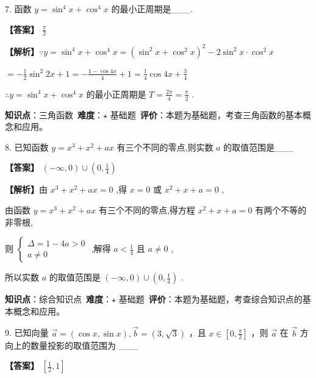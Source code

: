 \documentclass[10pt]{article}
\begin{document}
7. 函数 \(y = {\sin }^{4}x + {\cos }^{4}x\) 的最小正周期是___.

\textbf{【答案】} \(\frac{\pi }{2}\)

\textbf{【解析】}\(\because y = {\sin }^{4}x + {\cos }^{4}x = {\left( {\sin }^{2}x + {\cos }^{2}x\right) }^{2} - 2{\sin }^{2}x \cdot  {\cos }^{2}x\)

\(=  - \frac{1}{2}{\sin }^{2}{2x} + 1 =  - \frac{1 - \cos {4x}}{4} + 1 = \frac{1}{4}\cos {4x} + \frac{3}{4}\)

\(\therefore y = {\sin }^{4}x + {\cos }^{4}x\) 的最小正周期是 \(T = \frac{2\pi }{4} = \frac{\pi }{2}\) .

\begin{analysisbox}[考点分析]
\textbf{知识点}：三角函数\
\textbf{难度}：$\star$ 基础题\
\textbf{评价}：本题为基础题，考查三角函数的基本概念和应用。
\end{analysisbox}

8. 已知函数 \(y = {x}^{3} + {x}^{2} + {ax}\) 有三个不同的零点,则实数 \(a\) 的取值范围是___

\textbf{【答案】} \(\left( {-\infty ,0}\right)  \cup  \left( {0,\frac{1}{4}}\right)\)

\textbf{【解析】}由 \({x}^{3} + {x}^{2} + {ax} = 0\) ,得 \(x = 0\) 或 \({x}^{2} + x + a = 0\) ,

由函数 \(y = {x}^{3} + {x}^{2} + {ax}\) 有三个不同的零点,得方程 \({x}^{2} + x + a = 0\) 有两个不等的非零根,

则 \(\left\{  \begin{array}{l} \Delta  = 1 - {4a} > 0 \\  a \neq  0 \end{array}\right.\) ,解得 \(a < \frac{1}{4}\) 且 \(a \neq  0\) ,

所以实数 \(a\) 的取值范围是 \(\left( {-\infty ,0}\right)  \cup  \left( {0,\frac{1}{4}}\right)\) .

\begin{analysisbox}[考点分析]
\textbf{知识点}：综合知识点\
\textbf{难度}：$\star$ 基础题\
\textbf{评价}：本题为基础题，考查综合知识点的基本概念和应用。
\end{analysisbox}

9. 已知向量 \(\overrightarrow{a} = \left( {\cos x,\sin x}\right) ,\overrightarrow{b} = \left( {3,\sqrt{3}}\right)\) ，且 \(x \in  \left\lbrack  {0,\frac{\pi }{2}}\right\rbrack\) ，则 \(\overrightarrow{a}\) 在 \(\overrightarrow{b}\) 方向上的数量投影的取值范围为 ___

\textbf{【答案】} \(\left\lbrack  {\frac{1}{2},1}\right\rbrack\)
\end{document}
